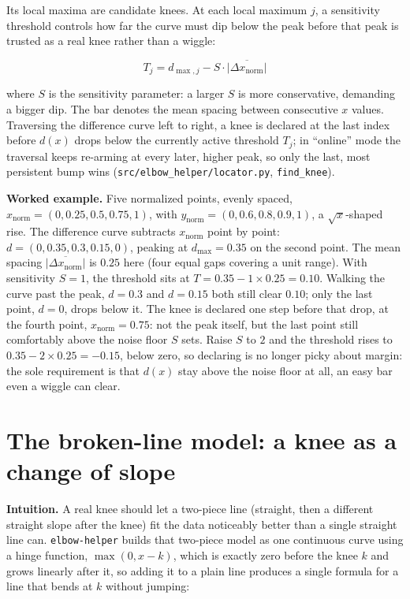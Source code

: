 \documentclass[11pt]{article}
\newcommand{\code}[1]{\texttt{#1}}
\begin{document}
Its local maxima are candidate knees. At each local maximum $j$, a
sensitivity threshold controls how far the curve must dip below the peak
before that peak is trusted as a real knee rather than a wiggle:

\begin{equation}
T_j = d_{\max, j} - S \cdot \overline{|\Delta x_{\text{norm}}|}
\end{equation}

where $S$ is the sensitivity parameter: a larger $S$ is more conservative,
demanding a bigger dip. The bar denotes the mean spacing between consecutive
$x$ values. Traversing the difference curve left to right, a knee is
declared at the last index before $d(x)$ drops below the currently active
threshold $T_j$; in ``online'' mode the traversal keeps re-arming at every
later, higher peak, so only the last, most persistent bump wins
(\code{src/elbow\_helper/locator.py}, \code{find\_knee}).

\textbf{Worked example.} Five normalized points, evenly spaced,
$x_{\text{norm}} = (0, 0.25, 0.5, 0.75, 1)$, with $y_{\text{norm}} = (0,
0.6, 0.8, 0.9, 1)$, a $\sqrt{x}$-shaped rise. The difference curve
subtracts $x_{\text{norm}}$ point by point: $d = (0, 0.35, 0.3, 0.15,
0)$, peaking at $d_{\max}=0.35$ on the second point. The mean spacing
$\overline{|\Delta x_{\text{norm}}|}$ is $0.25$ here (four equal gaps
covering a unit range). With sensitivity $S=1$, the threshold sits at
$T = 0.35 - 1 \times 0.25 = 0.10$. Walking the curve past the peak,
$d=0.3$ and $d=0.15$ both still clear $0.10$; only the last point,
$d=0$, drops below it. The knee is declared one step before that drop,
at the fourth point, $x_{\text{norm}}=0.75$: not the peak itself, but
the last point still comfortably above the noise floor $S$ sets. Raise
$S$ to $2$ and the threshold rises to $0.35 - 2\times 0.25 = -0.15$,
below zero, so declaring is no longer picky about margin: the sole
requirement is that $d(x)$ stay above the noise floor at all, an
easy bar even a wiggle can clear.

\section{The broken-line model: a knee as a change of slope}
\label{sec:hinge}

\textbf{Intuition.} A real knee should let a two-piece line (straight,
then a different straight slope after the knee) fit the data noticeably
better than a single straight line can. \code{elbow-helper} builds that
two-piece model as one continuous curve using a hinge function, $\max(0, x -
k)$, which is exactly zero before the knee $k$ and grows linearly after it,
so adding it to a plain line produces a single formula for a line that
bends at $k$ without jumping:
\end{document}
